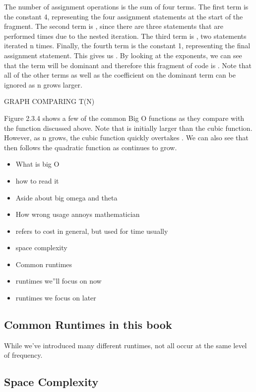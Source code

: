 The number of assignment operations is the sum of four terms. The first term is the constant 4, representing the four assignment statements at the start of the fragment. The second term is ,
since there are three statements that are performed times due to the nested iteration. The third term is , two statements iterated n times. Finally, the fourth term is the constant 1, representing the final assignment statement. This gives us . By looking at the exponents, we can see that the term will be dominant and therefore this fragment of code is . Note that all of the other terms as well as the coefficient on the dominant term can be ignored as n grows larger.


GRAPH COMPARING T(N)

Figure 2.3.4 shows a few of the common Big O functions as they compare with the function discussed above. Note that is initially larger than the cubic function. However, as n grows, the cubic function quickly overtakes . We can also see that then follows the quadratic function as continues to grow.

\begin{itemize}
	\item What is big O
	
	\item  how to read it
	\item Aside about big omega and theta
	\item How wrong usage annoys mathematician
	\item refers to cost in general, but used for time usually
	\item  space complexity 
	\item Common runtimes
	\item runtimes we''ll focus on now
	\item runtimes we focus on later
\end{itemize}


\subsection{Common Runtimes in this book}
While we've introduced many different runtimes, not all occur at the same level of frequency.





\subsection{Space Complexity}




